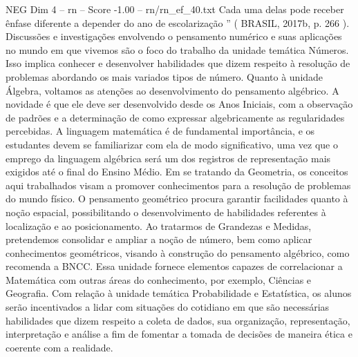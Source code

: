 \begin{textsample}{NEG Dim 4 – rn – Score -1.00 – rn/rn\_ef\_40.txt}
Cada uma delas pode receber ênfase diferente a depender do ano de escolarização ” ( BRASIL, 2017b, p. 266 ).
Discussões e investigações envolvendo o pensamento numérico e suas aplicações no mundo em que vivemos são o foco do trabalho da unidade temática Números.
Isso implica conhecer e desenvolver habilidades que dizem respeito à resolução de problemas abordando os mais variados tipos de número.
Quanto à unidade Álgebra, voltamos as atenções ao desenvolvimento do pensamento algébrico.
A novidade é que ele deve ser desenvolvido desde os Anos Iniciais, com a observação de padrões e a determinação de como expressar algebricamente as regularidades percebidas.
A linguagem matemática é de fundamental importância, e os estudantes devem se familiarizar com ela de modo significativo, uma vez que o emprego da linguagem algébrica será um dos registros de representação mais exigidos até o final do Ensino Médio.
Em se tratando da Geometria, os conceitos aqui trabalhados visam a promover conhecimentos para a resolução de problemas do mundo físico.
O pensamento geométrico procura garantir facilidades quanto à noção espacial, possibilitando o desenvolvimento de habilidades referentes à localização e ao posicionamento.
Ao tratarmos de Grandezas e Medidas, pretendemos consolidar e ampliar a noção de número, bem como aplicar conhecimentos geométricos, visando à construção do pensamento algébrico, como recomenda a BNCC.
Essa unidade fornece elementos capazes de correlacionar a Matemática com outras áreas do conhecimento, por exemplo, Ciências e Geografia.
Com relação à unidade temática Probabilidade e Estatística, os alunos serão incentivados a lidar com situações do cotidiano em que são necessárias habilidades que dizem respeito a coleta de dados, sua organização, representação, interpretação e análise a fim de fomentar a tomada de decisões de maneira ética e coerente com a realidade.

\end{textsample}

